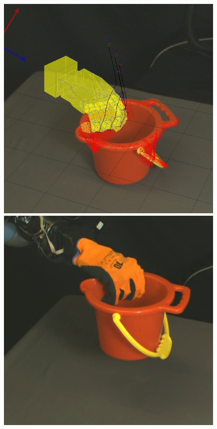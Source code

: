 \begin{figure}
\begin{center}
 \includegraphics[width=\tw]{images/experiments/query/bucket-1-s}
 \includegraphics[width=\tw]{images/experiments/exec/bucket-s}

\end{center}
\end{figure}
